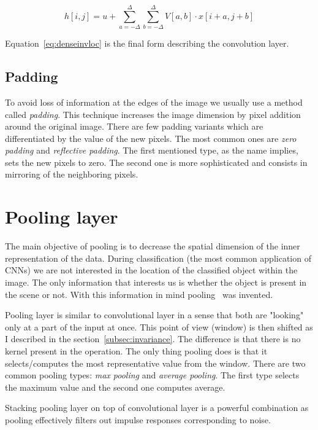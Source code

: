 \begin{equation}
    \label{eq:denseinvloc}
    h[i, j] = u + \sum_{a=-\Delta}^{\Delta} \sum_{b=-\Delta}^{\Delta} V[a,b] \cdot x[i+a,j+b]
\end{equation}

Equation~\ref{eq:denseinvloc} is the final form describing the convolution layer.

\subsection{Padding}\label{subsec:padding}
To avoid loss of information at the edges of the image we usually use a method called \textit{padding}.
This technique increases the image dimension by pixel addition around the original image.
There are few padding variants which are differentiated by the value of the new pixels.
The most common ones are \textit{zero padding} and \textit{reflective padding}.
The first mentioned type, as the name implies, sets the new pixels to zero.
The second one is more sophisticated and consists in mirroring of the neighboring pixels.

\section{Pooling layer}\label{sec:pooling}
The main objective of pooling is to decrease the spatial dimension of the inner representation of the data.
During classification (the most common application of CNNs) we are not interested in the location of the classified
object within the image.
The only information that interests us is whether the object is present in the scene or not.
With this information in mind pooling~\cite{PoolingLayer} was invented.

Pooling layer is similar to convolutional layer in a sense that both are "looking" only at a part of the input at once.
This point of view (window) is then shifted as I described in the section~\ref{subsec:invariance}.
The difference is that there is no kernel present in the operation.
The only thing pooling does is that it selects/computes the most representative value from the window.
There are two common pooling types: \textit{max pooling} and \textit{average pooling}.
The first type selects the maximum value and the second one computes average.

Stacking pooling layer on top of convolutional layer is a powerful combination as pooling effectively filters out
impulse responses corresponding to noise.